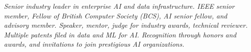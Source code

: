 {\selectfont
	\begin{justify}\textit{Senior industry leader in enterprise AI and data infrastructure. IEEE senior member, Fellow of British Computer Society (BCS), AI senior fellow, and advisory member. Speaker, mentor, judge for industry awards, technical reviewer. Multiple patents filed in data and ML for AI. Recognition through honors and awards, and invitations to join prestigious AI organizations.}\end{justify}
}
